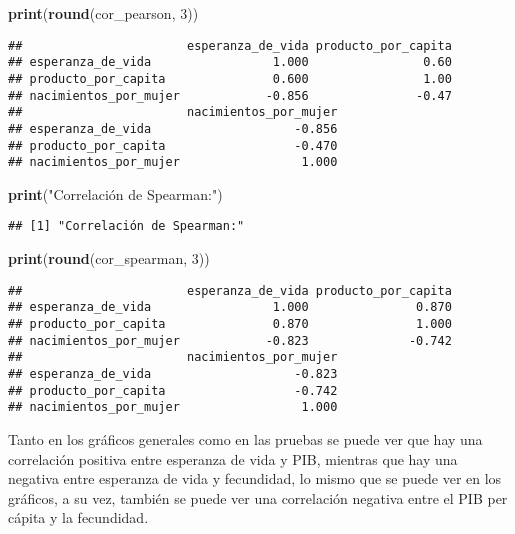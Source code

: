 \documentclass[
]{article}
\newenvironment{Shaded}{\begin{snugshade}}{\end{snugshade}}
\newcommand{\DecValTok}[1]{\textcolor[rgb]{0.00,0.00,0.81}{#1}}
\newcommand{\FunctionTok}[1]{\textcolor[rgb]{0.13,0.29,0.53}{\textbf{#1}}}
\newcommand{\NormalTok}[1]{#1}
\newcommand{\StringTok}[1]{\textcolor[rgb]{0.31,0.60,0.02}{#1}}
\begin{document}
\begin{Shaded}
\begin{Highlighting}[]
\FunctionTok{print}\NormalTok{(}\FunctionTok{round}\NormalTok{(cor\_pearson, }\DecValTok{3}\NormalTok{))}
\end{Highlighting}
\end{Shaded}

\begin{verbatim}
##                       esperanza_de_vida producto_por_capita
## esperanza_de_vida                 1.000                0.60
## producto_por_capita               0.600                1.00
## nacimientos_por_mujer            -0.856               -0.47
##                       nacimientos_por_mujer
## esperanza_de_vida                    -0.856
## producto_por_capita                  -0.470
## nacimientos_por_mujer                 1.000
\end{verbatim}

\begin{Shaded}
\begin{Highlighting}[]
\FunctionTok{print}\NormalTok{(}\StringTok{"Correlación de Spearman:"}\NormalTok{)}
\end{Highlighting}
\end{Shaded}

\begin{verbatim}
## [1] "Correlación de Spearman:"
\end{verbatim}

\begin{Shaded}
\begin{Highlighting}[]
\FunctionTok{print}\NormalTok{(}\FunctionTok{round}\NormalTok{(cor\_spearman, }\DecValTok{3}\NormalTok{))}
\end{Highlighting}
\end{Shaded}

\begin{verbatim}
##                       esperanza_de_vida producto_por_capita
## esperanza_de_vida                 1.000               0.870
## producto_por_capita               0.870               1.000
## nacimientos_por_mujer            -0.823              -0.742
##                       nacimientos_por_mujer
## esperanza_de_vida                    -0.823
## producto_por_capita                  -0.742
## nacimientos_por_mujer                 1.000
\end{verbatim}

Tanto en los gráficos generales como en las pruebas se puede ver que hay
una correlación positiva entre esperanza de vida y PIB, mientras que hay
una negativa entre esperanza de vida y fecundidad, lo mismo que se puede
ver en los gráficos, a su vez, también se puede ver una correlación
negativa entre el PIB per cápita y la fecundidad.
\end{document}
